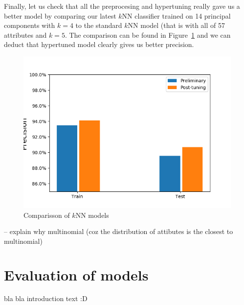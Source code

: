 \documentclass[11pt,a4paper]{article}
\begin{document}
Finally, let us check that all the preprocesing and hypertuning really gave us a better model by comparing our latest $k$NN classifier trained on 14 principal components with $k=4$ to the standard $k$NN model (that is with all of 57 attributes and $k=5$. The comparison can be found in Figure~\ref{fig:kNN_model_comparison} and we can deduct that hypertuned model clearly gives us better precision.
\begin{figure}[ht!]
\begin{center}
\includegraphics[scale=0.60]{kNN_model_comparison_precision.png}
\caption{Comparisson of $k$NN models}
\label{fig:kNN_model_comparison}
\end{center}
\end{figure}



\bigskip

\noindent
{}

\smallskip

-- explain why multinomial (coz the distribution of attibutes is the closest to multinomial) 


\bigskip

\noindent
{}

\smallskip


\section{Evaluation of models}
\label{sec-evaluation}

bla bla introduction text :D
\end{document}

